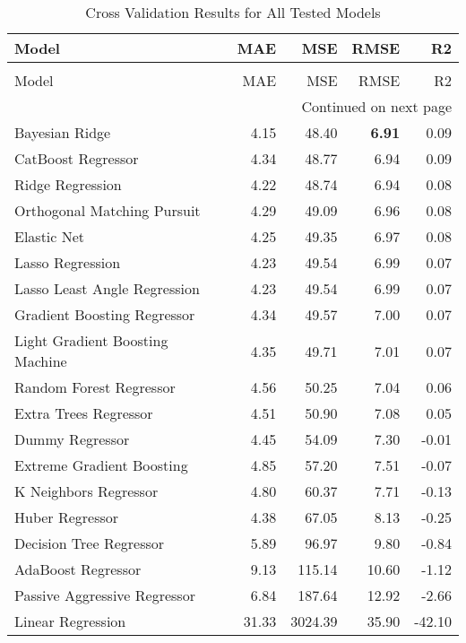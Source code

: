 \begin{longtable}{lrrrr}
\caption{Cross Validation Results for All Tested Models}
\label{tab:cross-validated-results}\\
\toprule
                          Model &   MAE &     MSE &  RMSE &     R2 \\
\midrule
\endfirsthead
\caption[]{Cross Validation Results for All Tested Models} \\
\toprule
                          Model &   MAE &     MSE &  RMSE &     R2 \\
\midrule
\endhead
\midrule
\multicolumn{5}{r}{{Continued on next page}} \\
\midrule
\endfoot

\bottomrule
\endlastfoot 
                 Bayesian Ridge &  4.15 &   48.40 &  \textbf{6.91} &   0.09 \\
             CatBoost Regressor &  4.34 &   48.77 &  6.94 &   0.09 \\
               Ridge Regression &  4.22 &   48.74 &  6.94 &   0.08 \\
    Orthogonal Matching Pursuit &  4.29 &   49.09 &  6.96 &   0.08 \\
                    Elastic Net &  4.25 &   49.35 &  6.97 &   0.08 \\
               Lasso Regression &  4.23 &   49.54 &  6.99 &   0.07 \\
   Lasso Least Angle Regression &  4.23 &   49.54 &  6.99 &   0.07 \\
    Gradient Boosting Regressor &  4.34 &   49.57 &  7.00 &   0.07 \\
Light Gradient Boosting Machine &  4.35 &   49.71 &  7.01 &   0.07 \\
        Random Forest Regressor &  4.56 &   50.25 &  7.04 &   0.06 \\
          Extra Trees Regressor &  4.51 &   50.90 &  7.08 &   0.05 \\
                Dummy Regressor &  4.45 &   54.09 &  7.30 &  -0.01 \\
      Extreme Gradient Boosting &  4.85 &   57.20 &  7.51 &  -0.07 \\
          K Neighbors Regressor &  4.80 &   60.37 &  7.71 &  -0.13 \\
                Huber Regressor &  4.38 &   67.05 &  8.13 &  -0.25 \\
        Decision Tree Regressor &  5.89 &   96.97 &  9.80 &  -0.84 \\
             AdaBoost Regressor &  9.13 &  115.14 & 10.60 &  -1.12 \\
   Passive Aggressive Regressor &  6.84 &  187.64 & 12.92 &  -2.66 \\
              Linear Regression & 31.33 & 3024.39 & 35.90 & -42.10 \\
\end{longtable}

